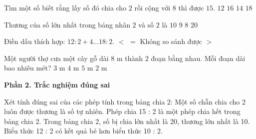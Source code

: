 \begin{ex} %
Tìm một số biết rằng lấy số đó chia cho $2$ rồi cộng với $8$ thì được $15$.
\choice
{$12$}
{$16$}
{\True $14$}
{$18$}
\end{ex}

\begin{ex} %
Thương của số lớn nhất trong bảng nhân $2$ và số $2$ là
\choice
{\True $10$}
{$9$}
{$8$}
{$20$}
\end{ex}

\begin{ex} %
Điền dấu thích hợp: $12 : 2 + 4 \dots 18 : 2$.
\choice
{$<$}
{$=$}
{Không so sánh được}
{\True $>$}
\end{ex}

\begin{ex} %
Một người thợ cưa một cây gỗ dài $8\text{ m}$ thành $2$ đoạn bằng nhau. Mỗi đoạn dài bao nhiêu mét?
\choice
{$3\text{ m}$}
{\True $4\text{ m}$}
{$5\text{ m}$}
{$2\text{ m}$}
\end{ex}

\textbf{Phần 2. Trắc nghiệm đúng sai}

\begin{ex} %
Xét tính đúng sai của các phép tính trong bảng chia 2:
\choiceTF
{\True Một số chẵn chia cho 2 luôn được thương là số tự nhiên.}
{Phép chia 15 : 2 là một phép chia hết trong bảng chia 2.}
{\True Trong bảng chia 2, số bị chia lớn nhất là 20, thương lớn nhất là 10.}
{Biểu thức 12 : 2 có kết quả bé hơn biểu thức 10 : 2.}
\end{ex}

